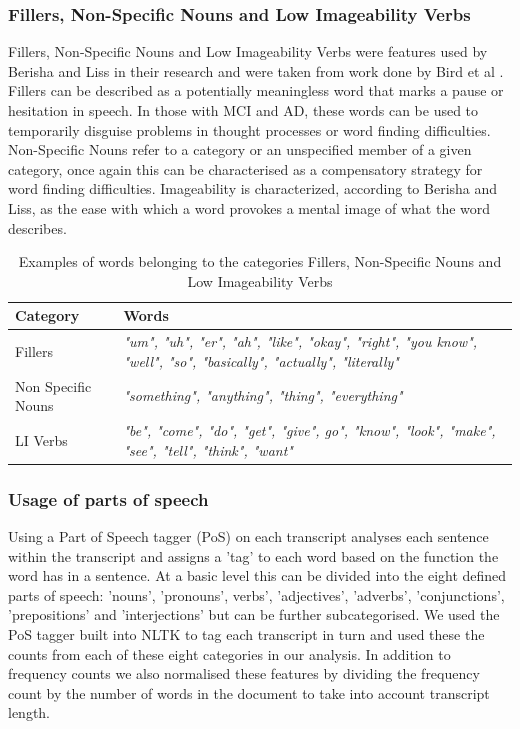 \documentclass[12pt]{article}
\begin{document}
\subsubsection{Fillers, Non-Specific Nouns and Low Imageability Verbs}
Fillers, Non-Specific Nouns and Low Imageability Verbs were features used by Berisha and Liss in their research \cite{Berisha2015} and were taken from work done by Bird et al \cite{Bird2000}. Fillers can be described as a potentially meaningless word that marks a pause or hesitation in speech. In those with MCI and AD, these words can be used to temporarily disguise problems in thought processes or word finding difficulties. Non-Specific Nouns refer to a category or an unspecified member of a given category, once again this can be characterised as a compensatory strategy for word finding difficulties. Imageability is characterized, according to Berisha and Liss, as the ease with which a word provokes a mental image of what the word describes. 

\begin{table}[H]
	\begin{center}
	\begin{tabular}{ | p{3cm} | p{10cm} |}
		\hline
		Category & Words \\ \hline
		Fillers & \textit{"um", "uh", "er", "ah", "like", "okay", "right",  "you know", "well", "so", "basically", "actually", "literally"} \\ \hline
		Non Specific Nouns & \textit{"something", "anything", "thing", "everything"} \\ \hline
		LI Verbs & \textit{"be", "come", "do", "get", "give", go", "know", "look", "make", "see", "tell", "think", "want"} \\ \hline
	\end{tabular}
	\caption{\label{tab:table-name}Examples of words belonging to the categories Fillers, Non-Specific Nouns and Low Imageability Verbs}
	\end{center} 
\end{table}

\subsubsection{Usage of parts of speech}
Using a Part of Speech tagger (PoS) on each transcript analyses each sentence within the transcript and assigns a 'tag' to each word based on the function the word has in a sentence. At a basic level this can be divided into the eight defined parts of speech: 'nouns', 'pronouns', verbs', 'adjectives', 'adverbs', 'conjunctions', 'prepositions' and 'interjections' but can be further subcategorised. We used the PoS tagger built into NLTK to tag each transcript in turn and used these the counts from each of these eight categories in our analysis. In addition to frequency counts we also normalised these features by dividing the frequency count by the number of words in the document to take into account transcript length.
\end{document}
